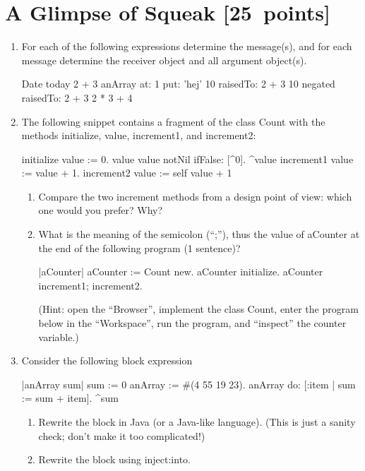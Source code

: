 \documentclass{article}
\begin{document}
\section{A Glimpse of Squeak [25~points]}
\begin{enumerate}
\item For each of the following expressions determine
the message(s), and for each message determine the receiver object and all 
argument object(s). 
\begin{java}
Date today 
2 + 3 
anArray at: 1 put: 'hej'
10 raisedTo: 2 + 3
10 negated raisedTo: 2 + 3
2 * 3 + 4      
\end{java}
\item The following snippet contains a fragment of the class \textsf{Count} with the methods \textsf{initialize},
 \textsf{value},  \textsf{increment1}, and \textsf{increment2}:
\begin{java}
initialize
    value := 0.
value
    value notNil ifFalse: [^0].
    ^value
increment1
    value := value + 1.
increment2
    value := self value + 1
\end{java}
\begin{enumerate}
\item Compare the two increment
methods from a design point of view: which one would you prefer?  Why?
\item What is the meaning of the semicolon (``;''), thus  the value of \textsf{aCounter} at the end of  the following program (1 sentence)?

\begin{java}
|aCounter|
aCounter := Count new.
aCounter initialize.
aCounter increment1; increment2.
\end{java}
(Hint: open the ``Browser'', implement the class \textsf{Count}, enter the
 program below in 
the ``Workspace'',
run the program, and ``inspect'' the counter variable.)
\end{enumerate}
\item Consider the following block expression
\begin{java}
|anArray sum|
sum := 0
anArray := #(4 55 19 23).
anArray do: [:item | sum := sum + item].
^sum
\end{java}
\begin{enumerate}
\item Rewrite the block in Java (or a Java-like language). (This is just
a sanity check; don't make it too complicated!)
\item Rewrite the block using \textsf{inject:into}.
\end{enumerate}
\end{enumerate}
\end{document}
